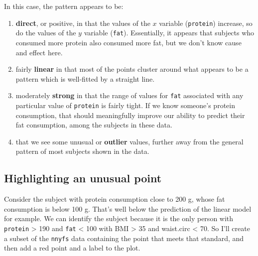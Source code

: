 \documentclass[
]{book}
\providecommand{\tightlist}{%
  \setlength{\itemsep}{0pt}\setlength{\parskip}{0pt}}
\begin{document}
In this case, the pattern appears to be:

\begin{enumerate}
\def\labelenumi{\arabic{enumi}.}
\tightlist
\item
  \textbf{direct}, or positive, in that the values of the \(x\) variable (\texttt{protein}) increase, so do the values of the \(y\) variable (\texttt{fat}). Essentially, it appears that subjects who consumed more protein also consumed more fat, but we don't know cause and effect here.
\item
  fairly \textbf{linear} in that most of the points cluster around what appears to be a pattern which is well-fitted by a straight line.
\item
  moderately \textbf{strong} in that the range of values for \texttt{fat} associated with any particular value of \texttt{protein} is fairly tight. If we know someone's protein consumption, that should meaningfully improve our ability to predict their fat consumption, among the subjects in these data.
\item
  that we see some unusual or \textbf{outlier} values, further away from the general pattern of most subjects shown in the data.
\end{enumerate}

\hypertarget{highlighting-an-unusual-point}{%
\subsection{Highlighting an unusual point}\label{highlighting-an-unusual-point}}

Consider the subject with protein consumption close to 200 g, whose fat consumption is below 100 g. That's well below the prediction of the linear model for example. We can identify the subject because it is the only person with \texttt{protein} \textgreater{} 190 and \texttt{fat} \textless{} 100 with BMI \textgreater{} 35 and waist.circ \textless{} 70. So I'll create a subset of the \texttt{nnyfs} data containing the point that meets that standard, and then add a red point and a label to the plot.
\end{document}
